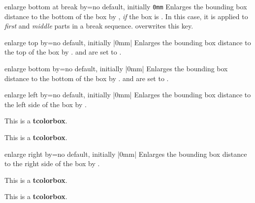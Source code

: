 \begin{docTcbKey}{enlarge bottom at break by}{=}{no default, initially \texttt{0mm}}
  Enlarges the bounding box distance to the bottom of the box by ,
  \emph{if} the box is .
  In this case, it is applied to \emph{first} and \emph{middle} parts in a
  break sequence.  overwrites this key.
\end{docTcbKey}


\begin{docTcbKey}{enlarge top by}{=}{no default, initially |0mm|}
  Enlarges the bounding box distance to the top of the box by .
   and
   are set to .
\end{docTcbKey}


\begin{docTcbKey}{enlarge bottom by}{=}{no default, initially |0mm|}
  Enlarges the bounding box distance to the bottom of the box by .
   and
   are set to .
\end{docTcbKey}


\begin{docTcbKey}{enlarge left by}{=}{no default, initially |0mm|}
  Enlarges the bounding box distance to the left side of the box by .
\begin{dispExample}

\begin{tcolorbox}[enlarge left by=2cm,width=5cm,enhanced,show bounding box]
This is a \textbf{tcolorbox}.
\end{tcolorbox}
\begin{tcolorbox}[enlarge left by=-2cm,width=\linewidth+2cm]
This is a \textbf{tcolorbox}.
\end{tcolorbox}
\end{dispExample}
\end{docTcbKey}

\begin{docTcbKey}{enlarge right by}{=}{no default, initially |0mm|}
  Enlarges the bounding box distance to the right side of the box by .
\begin{dispExample}

\begin{tcolorbox}[enlarge right by=-2cm,width=\linewidth+2cm,
  enhanced,show bounding box]
This is a \textbf{tcolorbox}.
\end{tcolorbox}
\begin{tcolorbox}[enlarge right by=2cm,width=\linewidth-2cm]
This is a \textbf{tcolorbox}.
\end{tcolorbox}
\end{dispExample}
\end{docTcbKey}


